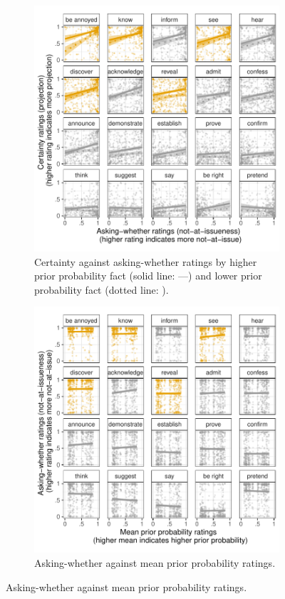 \documentclass[11pt,fleqn]{article}
\newcommand{\6}{\mbox{$[\hspace*{-.6mm}[$}}
\newcommand{\9}{\mbox{$]\hspace*{-.6mm}]$}}
\begin{document}
\begin{figure}[h!]
\begin{subfigure}[t]{0.49\textwidth}
\centering
\includegraphics[width=\textwidth]{../../results/exp2/graphs/projection-by-ai-and-prior}
\caption{Certainty against asking-whether ratings by higher prior probability fact (solid line: ---) and lower prior probability fact (dotted line: \raisebox{1mm}{\ldots}).}\label{fig:certainty-by-ai-and-priorExp2}
 \end{subfigure}\hfill 
\begin{subfigure}[t]{0.49\textwidth}
\centering
\includegraphics[width=\textwidth]{../../results/exp2/graphs/ai-by-prior}
\caption{Asking-whether against mean prior probability ratings.}\label{fig:ai-by-priorExp2}
\end{subfigure} 
  

\end{figure}
\end{document}
